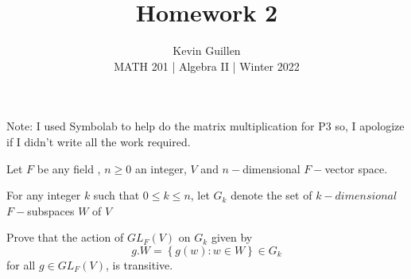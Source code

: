 \documentclass[11pt]{article}
\newenvironment{problem}[2][Problem\!]{\begin{trivlist}
\item[\hskip \labelsep {\bfseries #1}\hskip \labelsep {\bfseries #2}]}{\end{trivlist}}
\newcommand{\set}[1]{\left\{#1\right\}} %
\renewcommand{\geq}{\geqslant}
\renewcommand{\leq}{\leqslant}
\begin{document}
 
\title{Homework 2}
\author{Kevin Guillen\\[0.5em]
MATH 201  | Algebra II | Winter 2022}
\date{} 
\maketitle

Note: I used Symbolab to help do the matrix multiplication for P3 so, I apologize if I didn't write all the work required. 
\begin{tcolorbox}
  \begin{problem} {P1}
    Let $F$ be any field , $n \geq 0 $ an integer, $V$ and $n-$dimensional $F-$vector space.

    For any integer $k$ such that $0 \leq k \leq n$, let $G_k$ denote the set of $k-dimensional$ $F-$subspaces $W$ of $V$

    Prove that the action of $GL_F(V)$ on $G_k$ given by
    \[g.W = \set{g(w): w \in W} \in G_k\]
    for all $g \in GL_F(V)$, is transitive.
  \end{problem}
\end{tcolorbox}
\end{document}
